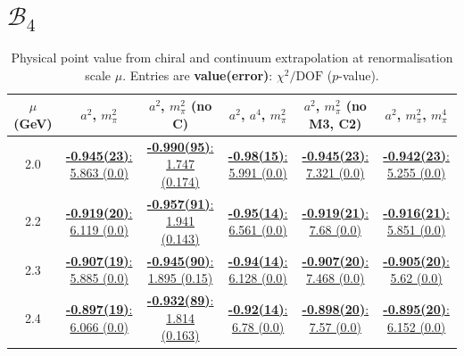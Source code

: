 \documentclass[12pt]{extarticle}
\begin{document}
\section{$\mathcal{B}_4$}
\begin{table}[h!]
\begin{center}
\begin{tabular}{|c|c|c|c|c|c|}
\hline
$\mu$ (GeV) & $a^2$, $m_\pi^2$& $a^2$, $m_\pi^2$ (no C)& $a^2$, $a^4$, $m_\pi^2$& $a^2$, $m_\pi^2$ (no M3, C2)& $a^2$, $m_\pi^2$, $m_\pi^4$\\
\hline
2.0& \hyperlink{SSpPP/NPR/a2m2_20.pdf.1}{\textbf{-0.945(23)}: 5.863 (0.0)} & \hyperlink{SSpPP/NPR/a2m2noC_20.pdf.1}{\textbf{-0.990(95)}: 1.747 (0.174)} & \hyperlink{SSpPP/NPR/a2a4m2_20.pdf.1}{\textbf{-0.98(15)}: 5.991 (0.0)} & \hyperlink{SSpPP/NPR/a2m2mcut_20.pdf.1}{\textbf{-0.945(23)}: 7.321 (0.0)} & \hyperlink{SSpPP/NPR/a2m2m4_20.pdf.1}{\textbf{-0.942(23)}: 5.255 (0.0)}\\
2.2& \hyperlink{SSpPP/NPR/a2m2_22.pdf.1}{\textbf{-0.919(20)}: 6.119 (0.0)} & \hyperlink{SSpPP/NPR/a2m2noC_22.pdf.1}{\textbf{-0.957(91)}: 1.941 (0.143)} & \hyperlink{SSpPP/NPR/a2a4m2_22.pdf.1}{\textbf{-0.95(14)}: 6.561 (0.0)} & \hyperlink{SSpPP/NPR/a2m2mcut_22.pdf.1}{\textbf{-0.919(21)}: 7.68 (0.0)} & \hyperlink{SSpPP/NPR/a2m2m4_22.pdf.1}{\textbf{-0.916(21)}: 5.851 (0.0)}\\
2.3& \hyperlink{SSpPP/NPR/a2m2_23.pdf.1}{\textbf{-0.907(19)}: 5.885 (0.0)} & \hyperlink{SSpPP/NPR/a2m2noC_23.pdf.1}{\textbf{-0.945(90)}: 1.895 (0.15)} & \hyperlink{SSpPP/NPR/a2a4m2_23.pdf.1}{\textbf{-0.94(14)}: 6.128 (0.0)} & \hyperlink{SSpPP/NPR/a2m2mcut_23.pdf.1}{\textbf{-0.907(20)}: 7.468 (0.0)} & \hyperlink{SSpPP/NPR/a2m2m4_23.pdf.1}{\textbf{-0.905(20)}: 5.62 (0.0)}\\
2.4& \hyperlink{SSpPP/NPR/a2m2_24.pdf.1}{\textbf{-0.897(19)}: 6.066 (0.0)} & \hyperlink{SSpPP/NPR/a2m2noC_24.pdf.1}{\textbf{-0.932(89)}: 1.814 (0.163)} & \hyperlink{SSpPP/NPR/a2a4m2_24.pdf.1}{\textbf{-0.92(14)}: 6.78 (0.0)} & \hyperlink{SSpPP/NPR/a2m2mcut_24.pdf.1}{\textbf{-0.898(20)}: 7.57 (0.0)} & \hyperlink{SSpPP/NPR/a2m2m4_24.pdf.1}{\textbf{-0.895(20)}: 6.152 (0.0)}\\
\hline
\end{tabular}
\caption{Physical point value from chiral and continuum extrapolation at renormalisation scale $\mu$. Entries are \textbf{value(error)}: $\chi^2/\text{DOF}$ ($p$-value).}
\end{center}
\end{table}
\end{document}
